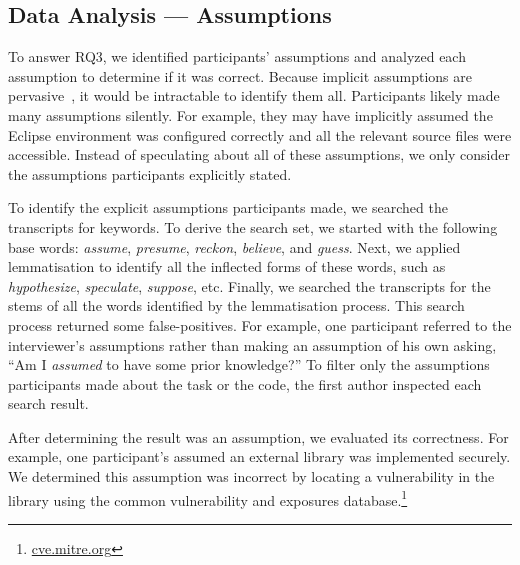 \documentclass[10pt,journal,compsoc]{IEEEtran}
\begin{document}

\subsection{Data Analysis --- Assumptions}
\label{sec:assumptionAnalysis}
 
To answer RQ3, we identified participants' assumptions and analyzed each assumption to determine if it was correct.
Because implicit assumptions are pervasive~\cite{fairclough2003analysing}, it would be intractable to identify them all. 
Participants likely made many assumptions silently. 
For example, they may have implicitly assumed the Eclipse environment was configured correctly and all the relevant source files were accessible.
Instead of speculating about all of these assumptions, we only consider the assumptions participants explicitly stated.

%
To identify the explicit assumptions participants made, we searched the transcripts for keywords.
To derive the search set, we started with the following base words: \textit{assume}, \textit{presume}, \textit{reckon}, \textit{believe}, and \textit{guess}.
Next, we applied lemmatisation to identify all the inflected forms of these words, such as \textit{hypothesize}, \textit{speculate}, \textit{suppose}, etc. 
Finally, we searched the transcripts for the stems of all the words identified by the lemmatisation process.
This search process returned some false-positives. 
For example, one participant referred to the interviewer's assumptions rather than making an assumption of his own asking, ``Am I \textit{assumed} to have some prior knowledge?''
To filter only the assumptions participants made about the task or the code, the first author inspected each search result.

After determining the result was an assumption, we evaluated its correctness.
For example, one participant's assumed an external library was implemented securely. 
We determined this assumption was incorrect by locating a vulnerability in the library using the common vulnerability and exposures database.\footnote{\url{cve.mitre.org}}
\end{document}
